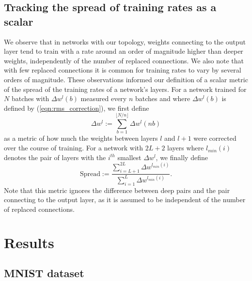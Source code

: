 \documentclass{article}
\begin{document}
\subsection{Tracking the spread of training rates as a scalar}

We observe that in networks with our topology, weights connecting to the output layer tend to train with a rate around an order of magnitude higher than deeper weights, independently of the number of replaced connections. We also note that with few replaced connections it is common for training rates to vary by several orders of magnitude. These observations informed our definition of a scalar metric of the spread of the training rates of a network's layers. For a network trained for $N$ batches with $\Delta w^l(b)$ measured every $n$ batches and where $\Delta w^l(b)$ is defined by (\ref{eqn:rms_correction}), we first define 
\begin{equation}
\label{eqn:training_sum}
\Delta w^l:=\sum_{b=1}^{\lfloor N/n\rfloor}\Delta w^l(nb)
\end{equation}
as a metric of how much the weights between layers $l$ and $l+1$ were corrected over the course of training. For a network with $2L+2$ layers where $l_{min}(i)$ denotes the pair of layers with the $i^{th}$ smallest $\Delta w^l$, we finally define 
\begin{equation}
\label{eqn:spread}
\text{Spread}:=\frac{\sum_{i=L+1}^{2L}\Delta w^{l_{min}(i)}}{\sum_{i=1}^L\Delta w^{l_{min}(i)}}.
\end{equation}
Note that this metric ignores the difference between deep pairs and the pair connecting to the output layer, as it is assumed to be independent of the number of replaced connections. 


\section{Results}
\subsection{MNIST dataset}
\end{document}
